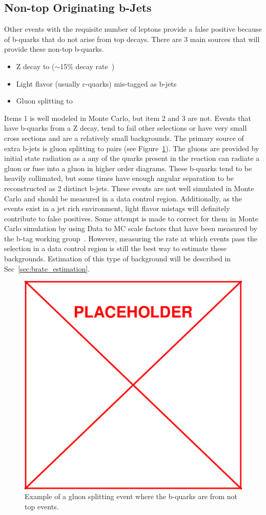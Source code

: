 \subsection{Non-top Originating b-Jets}
Other events with the requisite number of leptons provide a false positive because of b-quarks that do not arise from top decays. There are 3 main sources that will provide these non-top b-quarks.
\begin{itemize}
\item Z decay to \bbbar ($\sim$15\% decay rate~\cite{pdg})
\item Light flavor (usually c-quarks) mis-tagged as b-jets
\item Gluon splitting to \bbbar
\end{itemize}

Items 1 is well modeled in Monte Carlo, but item 2 and 3 are not. Events that have b-quarks from a Z decay, tend to fail other selections or have very small cross sections and are a relatively small backgrounds. The primary source of extra b-jets is gluon splitting to \bbbar pairs (see Figure~\ref{fig:gluon_splitting}). The gluons are provided by initial state radiation as a any of the quarks present in the reaction can radiate a gluon or fuse into a gluon in higher order diagrams. These b-quarks tend to be heavily collimated, but some times have enough angular separation to be reconstructed as 2 distinct b-jets. These events are not well simulated in Monte Carlo and should be measured in a data control region. Additionally, as the \ttZ events exist in a jet rich environment, light flavor mistags will definitely contribute to false positives. Some attempt is made to correct for them in Monte Carlo simulation by using Data to MC scale factors that have been measured by the b-tag working group~\cite{BTV11003}. However, measuring the rate at which events pass the selection in a data control region is still the best way to estimate these backgrounds. Estimation of this type of background will be described in Sec~\ref{sec:brate_estimation}. \\

			\begin{figure}[h]
\begin{center}
\includegraphics[width=0.48\linewidth]{Figs/placeholder.pdf}
\caption{\label{fig:gluon_splitting}
Example of a gluon splitting event where the b-quarks are from not top events.
}
\end{center}
\end{figure} 


